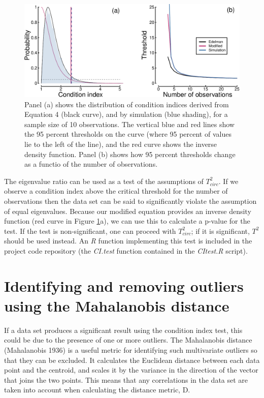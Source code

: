 \documentclass[]{article}
\begin{document}
\begin{figure}

{\centering \includegraphics{manuscript_files/figure-latex/distcomparison-1} 

}

\caption{Panel (a) shows the distribution of condition indices derived from Equation 4 (black curve), and by simulation (blue shading), for a sample size of 10 observations. The vertical blue and red lines show the 95 percent thresholds on the curve (where 95 percent of values lie to the left of the line), and the red curve shows the inverse density function. Panel (b) shows how 95 percent thresholds change as a functio of the number of observations.}\label{fig:distcomparison}
\end{figure}

The eigenvalue ratio can be used as a test of the assumptions of \(T^2_{circ}\). If we observe a condition index above the critical threshold for the number of observations then the data set can be said to significantly violate the assumption of equal eigenvalues. Because our modified equation provides an inverse density function (red curve in Figure \ref{fig:distcomparison}a), we can use this to calculate a p-value for the test. If the test is non-significant, one can proceed with \(T^2_{circ}\); if it is significant, \(T^2\) should be used instead. An \emph{R} function implementing this test is included in the project code repository (the \emph{CI.test} function contained in the \emph{CItest.R} script).

\hypertarget{identifying-and-removing-outliers-using-the-mahalanobis-distance}{%
\section{Identifying and removing outliers using the Mahalanobis distance}\label{identifying-and-removing-outliers-using-the-mahalanobis-distance}}

If a data set produces a significant result using the condition index test, this could be due to the presence of one or more outliers. The Mahalanobis distance (Mahalanobis 1936) is a useful metric for identifying such multivariate outliers so that they can be excluded. It calculates the Euclidean distance between each data point and the centroid, and scales it by the variance in the direction of the vector that joins the two points. This means that any correlations in the data set are taken into account when calculating the distance metric, D.
\end{document}
